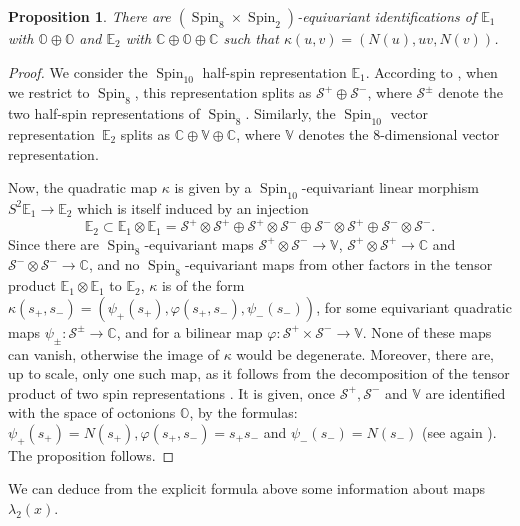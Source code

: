 \documentclass[10pt]{amsart}
\let\mathcal\mathscr
\newcommand{\citestar}[3]{\cite[#3]{#1}}
\theoremstyle{plain}
\newtheorem{prop}[theo]{Proposition}
\theoremstyle{definition}
\DeclareMathOperator{\Spin}{Spin}
\newcommand{\cS}{\mathcal{S}}
\newcommand{\bC}{\mathbb{C}}
\newcommand{\bE}{\mathbb{E}}
\newcommand{\bO}{\mathbb{O}}
\newcommand{\bV}{\mathbb{V}}
\begin{document}
\begin{prop}
\label{prop:spin-10}
There are $(\Spin_8 \times \Spin_2)$-equivariant identifications
of $\bE_1$ with $\bO \oplus \bO$ and $\bE_2$ with $\bC \oplus \bO \oplus \bC$
such that $\kappa(u,v)=(N(u),uv,N(v))$.
\end{prop}
\begin{proof}
We consider the $\Spin_{10}$ half-spin representation $\bE_1$. According to \cite{chevalley}, when we
restrict to $\Spin_8$, this representation splits as $\cS^+ \oplus \cS^-$, where $\cS^\pm$ denote the two
half-spin representations of $\Spin_8$. Similarly, the $\Spin_{10}$ vector representation~$\bE_2$ splits as
$\bC \oplus \bV \oplus \bC$, where $\bV$ denotes the $8$-dimensional vector representation.

Now, the quadratic map $\kappa$ is given by a $\Spin_{10}$-equivariant linear morphism
\hbox{$S^2 \bE_1 \to \bE_2$} which is itself induced by an
injection
$$\bE_2 \subset \bE_1 \otimes \bE_1 =
\cS^+ \otimes \cS^+ \oplus \cS^+ \otimes \cS^- \oplus \cS^- \otimes \cS^+ \oplus \cS^- \otimes \cS^-.$$
Since there are $\Spin_8$-equivariant maps $\cS^+ \otimes \cS^- \to \bV$,
$\cS^+ \otimes \cS^+ \to \bC$ and $\cS^- \otimes \cS^- \to \bC$, and no $\Spin_8$-equivariant maps from other
factors in the tensor product $\bE_1 \otimes \bE_1$ to $\bE_2$, $\kappa$ is of the form
$\kappa(s_+,s_-) = (\psi_+(s_+), \varphi(s_+,s_-), \psi_-(s_-))$, for some equivariant
quadratic maps $\psi_\pm: \cS^\pm \to \bC$, and for a bilinear map $\varphi:\cS^+ \times \cS^- \to \bV$.
None of these maps can vanish, otherwise the image of $\kappa$
would be degenerate. Moreover, there are, up to scale, only one such map, as it follows from
the decomposition of the tensor product of two spin representations
\citestar{chevalley}*{}.
It is given,
once $\cS^+,\cS^-$ and $\bV$ are identified with the space of octonions $\bO$, by the formulas:
$\psi_+(s_+)=N(s_+),\varphi(s_+,s_-)=s_+s_-$ and $\psi_-(s_-)=N(s_-)$
(see again \citestar{chevalley}*{}). The proposition follows.
\end{proof}

We can deduce from the explicit formula above some information about maps~$\lambda_2(x)$.
\end{document}
